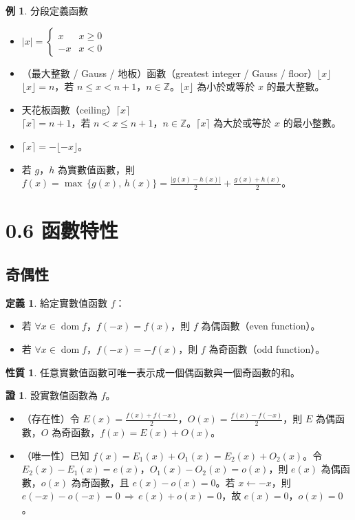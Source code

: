 \documentclass[12pt]{extarticle}
\newcommand{\ds}{\displaystyle}
\newcommand{\ie}{\,\Longrightarrow\,}
\DeclareMathOperator*{\dom}{dom}
\newcommand{\floor}[1]{\lfloor #1 \rfloor}
\newcommand{\ceil}[1]{\lceil #1 \rceil}
\theoremstyle{definition}
\newtheorem*{dfn}{定義}
\newtheorem*{prp}{性質}
\newtheorem*{ex}{例}
\newtheorem*{prf}{證}
\begin{document}
\begin{ex}分段定義函數
  \begin{itemize}\setlength\itemsep{0em}
    \item $\ds|x| = \begin{cases} x & x\geqslant 0 \\ -x & x< 0\end{cases}$
    \item （最大整數 / Gauss / 地板）函數（greatest integer / Gauss / floor）$\floor{x}$ \\
      $\ds\floor{x} = n$，若 $n\leqslant x < n + 1$，$n\in\mathbb{Z}$。$\floor{x}$ 為小於或等於 $x$ 的最大整數。    
    \item 天花板函數（ceiling）$\ceil{x}$ \\
      $\ds\ceil{x} = n + 1$，若 $n < x \leqslant n + 1$，$n\in\mathbb{Z}$。$\ceil{x}$ 為大於或等於 $x$ 的最小整數。
    \item $\ds\ceil{x} = -\floor{-x}$。
    \item 若 $g$，$h$ 為實數值函數，則 $\ds f(x) = \max\,\{g(x),\,h(x)\} = \frac{|g(x) - h(x)|}{2} + \frac{g(x) + h(x)}{2}$。
  \end{itemize}
\end{ex}

\section*{0.6 函數特性}
\subsection*{奇偶性}
\begin{dfn} 給定實數值函數 $f$：
  \begin{itemize}\setlength\itemsep{0em}
    \item 若 $\forall x\in\dom f$，$f(-x) = f(x)$，則 $f$ 為偶函數（even function）。
    \item 若 $\forall x\in\dom f$，$f(-x) = -f(x)$，則 $f$ 為奇函數（odd function）。
  \end{itemize}
\end{dfn}

\begin{prp}
  任意實數值函數可唯一表示成一個偶函數與一個奇函數的和。
\end{prp}

\begin{prf} 設實數值函數為 $f$。
  \begin{itemize}\setlength\itemsep{0em}
    \item（存在性）令 $\ds E(x) = \frac{f(x) + f(-x)}{2}$，$\ds O(x) = \frac{f(x) - f(-x)}{2}$，則 $E$ 為偶函數，$O$ 為奇函數，$f(x) = E(x) + O(x)$。
    \item（唯一性）已知 $\ds f(x) = E_1(x) + O_1(x) = E_2(x) + O_2(x)$。令 $E_2(x) - E_1(x) = e(x)$，$O_1(x) - O_2(x) = o(x)$，則 $e(x)$ 為偶函數，$o(x)$ 為奇函數，且 $e(x) - o(x) = 0$。若 $x\leftarrow -x$，則 $e(-x) - o(-x) = 0 \ie e(x) + o(x) = 0$，故 $e(x) = 0$，$o(x) = 0$。
  \end{itemize}
\end{prf}
\end{document}

